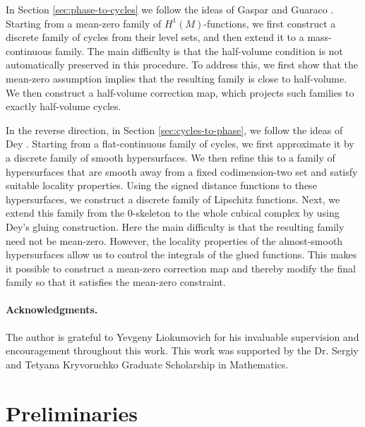 \documentclass[12pt,english]{article}
\theoremstyle{definition}
\begin{document}
In Section \ref{sec:phase-to-cycles} we follow the ideas of Gaspar and Guaraco \cite{GG2}. Starting from a mean-zero family of $H^1(M)$-functions, we first construct a discrete family of cycles from their level sets, and then extend it to a mass-continuous family. The main difficulty is that the half-volume condition is not automatically preserved in this procedure. To address this, we first show that the mean-zero assumption implies that the resulting family is close to half-volume. We then construct a half-volume correction map, which projects such families to exactly half-volume cycles.

In the reverse direction, in Section \ref{sec:cycles-to-phase}, we follow the ideas of Dey \cite{Dey}. Starting from a flat-continuous family of cycles, we first approximate it by a discrete family of smooth hypersurfaces. We then refine this to a family of hypersurfaces that are smooth away from a fixed codimension-two set and satisfy suitable locality properties. Using the signed distance functions to these hypersurfaces, we construct a discrete family of Lipschitz functions. Next, we extend this family from the $0$-skeleton to the whole cubical complex by using Dey's gluing construction. Here the main difficulty is that the resulting family need not be mean-zero. However, the locality properties of the almost-smooth hypersurfaces allow us to control the integrals of the glued functions. This makes it possible to construct a mean-zero correction map and thereby modify the final family so that it satisfies the mean-zero constraint.

\paragraph*{Acknowledgments.} The author is grateful to Yevgeny Liokumovich for his invaluable supervision and encouragement throughout this work. This work was supported by the Dr. Sergiy and Tetyana Kryvoruchko Graduate Scholarship in Mathematics.

\section{Preliminaries}
\label{sec:prelim}
\end{document}
